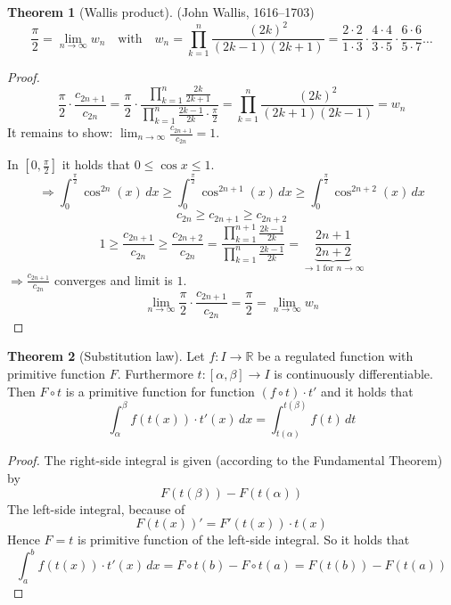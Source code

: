 \documentclass[a4paper,landscape,twocolumn]{article}
\theoremstyle{definition}
\newtheorem{theorem}{Theorem}
\begin{document}
\begin{theorem}[Wallis product]
  (John Wallis, 1616--1703)
  \[
    \frac\pi2 = \lim_{n\to\infty} w_n
    \quad \text{with} \quad
    w_n = \prod_{k=1}^n \frac{(2k)^2}{(2k-1)(2k+1)}
    = \frac{2 \cdot 2}{1 \cdot 3} \cdot \frac{4 \cdot 4}{3 \cdot 5} \cdot \frac{6 \cdot 6}{5 \cdot 7} \ldots
  \]
\end{theorem}
\begin{proof}
  \[
    \frac\pi2 \cdot \frac{c_{2n+1}}{c_{2n}}
      = \frac\pi2 \cdot \frac{\prod_{k=1}^n \frac{2k}{2k+1}}{\prod_{k=1}^n \frac{2k-1}{2k} \cdot \frac\pi2}
      = \prod_{k=1}^n \frac{(2k)^2}{(2k + 1)(2k - 1)} = w_n
  \]
  It remains to show: $\lim_{n\to\infty} \frac{c_{2n+1}}{c_{2n}} = 1$.

  In $\left[0, \frac\pi2\right]$ it holds that $0 \leq \cos{x} \leq 1$.
  \[
    \Rightarrow \int_0^{\frac\pi2} \cos^{2n}(x) \, dx
    \geq \int_0^{\frac\pi2} \cos^{2n+1}(x) \, dx
    \geq \int_0^{\frac\pi2} \cos^{2n+2}(x) \, dx
  \] \[
    c_{2n} \geq c_{2n+1} \geq c_{2n+2}
  \] \[
    1 \geq \frac{c_{2n+1}}{c_{2n}} \geq \frac{c_{2n+2}}{c_{2n}}
    = \frac{\prod_{k=1}^{n+1} \frac{2k - 1}{2k}}{\prod_{k=1}^n \frac{2k - 1}{2k}}
    = \underbrace{\frac{2n+1}{2n+2}}_{\to 1 \text{ for } n \to \infty}
  \]
  $\Rightarrow \frac{c_{2n+1}}{c_{2n}}$ converges and limit is $1$.
  \[ \lim_{n\to\infty} \frac{\pi}2 \cdot \frac{c_{2n+1}}{c_{2n}} = \frac\pi2 = \lim_{n\to\infty} w_n \]
\end{proof}

\begin{theorem}[Substitution law]
  Let $f: I \to \mathbb R$ be a regulated function with primitive function
  $F$. Furthermore $t: [\alpha, \beta] \to I$ is continuously differentiable.
  Then $F \circ t$ is a primitive function for function $(f \circ t) \cdot t'$
  and it holds that
  \[
    \int_{\alpha}^\beta f(t(x)) \cdot t'(x) \, dx
      = \int_{t(\alpha)}^{t(\beta)} f(t) \, dt
  \]
\end{theorem}

\begin{proof}
  The right-side integral is given (according to the Fundamental Theorem) by
  \[ F(t(\beta)) - F(t(\alpha)) \]
  The left-side integral, because of
  \[ F(t(x))' = F'(t(x)) \cdot t(x) \]
  Hence $F = t$ is primitive function of the left-side integral.
  So it holds that
  \[
    \int_a^b f(t(x)) \cdot t'(x) \, dx
    = F \circ t(b) - F \circ t(a)
    = F(t(b)) - F(t(a))
  \]
\end{proof}
\end{document}
